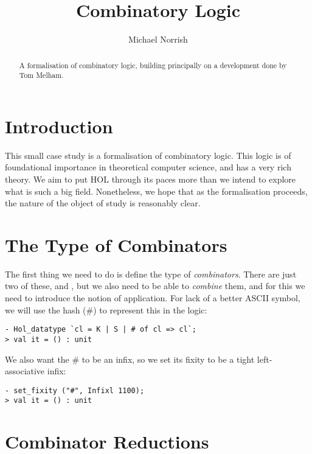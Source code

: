 \documentclass[12pt]{article}
\title{Combinatory Logic}
\author{Michael Norrish}
\date{}
\newcommand{\KC}{\con{K}}
\newcommand{\SC}{\con{S}}
\begin{document}
\maketitle

\begin{abstract}
A formalisation of combinatory logic, building principally on a
development done by Tom Melham.
\end{abstract}


\section{Introduction}
\label{sec:Introduction}

This small case study is a formalisation of combinatory logic.  This
logic is of foundational importance in theoretical computer science,
and has a very rich theory.  We aim to put HOL through its paces more
than we intend to explore what is such a big field.  Nonetheless, we
hope that as the formalisation proceeds, the nature of the object of
study is reasonably clear.


\section{The Type of Combinators}
\label{sec:Type-Combinators}

The first thing we need to do is define the type of
\emph{combinators}.  There are just two of these, \KC{} and \SC, but
we also need to be able to \emph{combine} them, and for this we need
to introduce the notion of application.  For lack of a better ASCII
symbol, we will use the hash (\#) to represent this in the logic:
\begin{session}\begin{verbatim}
- Hol_datatype `cl = K | S | # of cl => cl`;
> val it = () : unit
\end{verbatim}\end{session}

We also want the \# to be an infix, so we set its fixity to be a tight
left-associative infix:
\begin{session}\begin{verbatim}
- set_fixity ("#", Infixl 1100);
> val it = () : unit
\end{verbatim}\end{session}



\section{Combinator Reductions}
\label{sec:Comb-Reduct}
\end{document}
